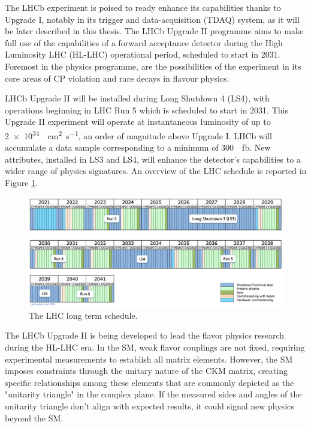 The LHCb experiment is poised to ready enhance its capabilities thanks to Upgrade I, notably in its trigger and data-acquisition (TDAQ) system, as it will be later described in this thesis. 
The LHCb Upgrade II programme aims to make full use of the capabilities of a forward acceptance detector during the High Luminosity LHC (HL-LHC) operational period, scheduled to start in 2031. Foremost in the physics programme, are the possibilities of the experiment in its core areas of CP violation and rare decays in flavour physics.

LHCb Upgrade II will be installed during Long Shutdown 4 (LS4), with operations beginning in LHC Run 5 which is scheduled to start in 2031. This Upgrade II experiment will operate at instantaneous luminosity of up to \SI{2e34}{\per\centi\meter\squared\per\second}, an order of magnitude above Upgrade I. LHCb will accumulate a data sample corresponding to a minimum of \SI{300}{\per\femto\barn}. New attributes, installed in LS3 and LS4, will enhance the detector’s capabilities to a wider range of physics signatures. An overview of the LHC schedule is reported in Figure \ref{fig:LHC_schedule}.

\begin{figure}[h]
    \centering
    \includegraphics[width=\textwidth]{resources/LHC-long-term-Apr23.png}
    \caption{The LHC long term schedule.}
    \label{fig:LHC_schedule}
\end{figure}

The LHCb Upgrade II is being developed to lead the flavor physics research during the HL-LHC era. In the SM, weak flavor couplings are not fixed, requiring experimental measurements to establish all matrix elements. However, the SM imposes constraints through the unitary nature of the CKM matrix, creating specific relationships among these elements that are commonly depicted as the "unitarity triangle" in the complex plane. If the measured sides and angles of the unitarity triangle don't align with expected results, it could signal new physics beyond the SM.

